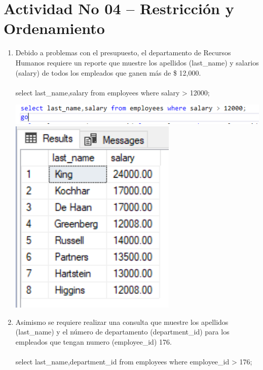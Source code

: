 \section{Actividad No 04 – Restricci\'on y Ordenamiento} 
		
\begin{enumerate}[1.]
	\item Debido a problemas con el presupuesto, el departamento de Recursos Humanos requiere un reporte que muestre los apellidos (last\_name) y salarios (salary) de todos los empleados que ganen más de \$ 12,000.
	\\ \\ select last\_name,salary from employees where salary > 12000;

	\begin{center}
	\includegraphics[width=17cm]{./Imagenes/actividad_04_01a} 
	\includegraphics[width=8cm]{./Imagenes/actividad_04_01} 
	\end{center}

	\item Asimismo se requiere realizar una consulta que muestre los apellidos (last\_name) y el n\'umero de departamento (department\_id) para los empleados que tengan numero (employee\_id) 176.
	\\ \\select last\_name,department\_id from employees where employee\_id > 176;


\end{enumerate}
